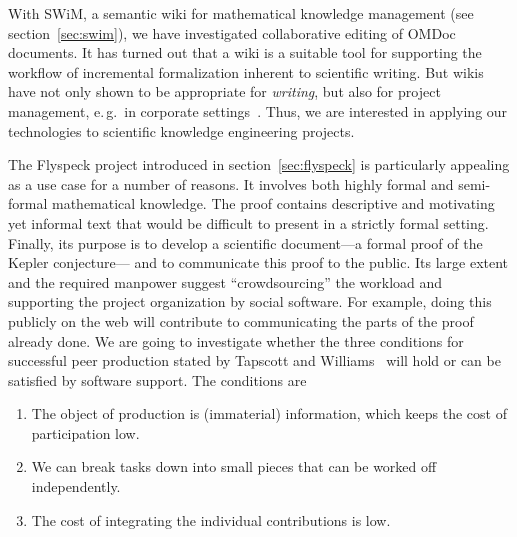 With SWiM, a semantic wiki for mathematical knowledge management (see
section~\ref{sec:swim}), we have investigated collaborative editing of OMDoc documents.
It has turned out that a wiki is a suitable tool for supporting the workflow of
incremental formalization inherent to scientific writing.  But wikis have not only shown
to be appropriate for \emph{writing}, but also for project management, e.\,g.\ in
corporate settings~\cite{leuf01:wikiway}.  Thus, we are interested in applying our
technologies to scientific knowledge engineering projects.  

The Flyspeck project
introduced in section~\ref{sec:flyspeck} is particularly appealing as a use case
for a number of reasons. It
involves both highly formal and semi-formal mathematical knowledge.   
The proof contains descriptive and motivating yet informal text that would
be difficult to present in a strictly formal setting.
Finally, its purpose is to develop a scientific document---a formal proof of the Kepler
conjecture--- and to communicate this proof to the public.  Its large extent and the
required manpower suggest ``crowdsourcing'' the workload and supporting the project
organization by social software.  For example, doing this publicly on the web will contribute to
communicating the parts of the proof already done.  We are going to investigate whether
the three conditions for successful peer production stated by Tapscott and
Williams~\cite{wikinomics} will hold or can be satisfied by software support.
The conditions are
\begin{enumerate} 
\item The object of production is (immaterial) information, which
  keeps the cost of participation low.
\item We can break tasks down into small pieces that can be worked
  off independently.
\item The cost of integrating the individual contributions is low.
\end{enumerate} 


